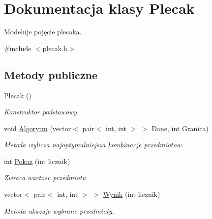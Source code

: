 \hypertarget{class_plecak}{\section{\-Dokumentacja klasy \-Plecak}
\label{class_plecak}
}


\-Modeluje pojęcie plecaka.  




{\ttfamily \#include $<$plecak.\-h$>$}

\subsection*{\-Metody publiczne}
\begin{DoxyCompactItemize}
\item 
\hyperlink{class_plecak_a480d062c962f629f878170f53abbdc44}{\-Plecak} ()
\begin{DoxyCompactList}\small\item\em \-Konstruktor podstawowy. \end{DoxyCompactList}\item 
void \hyperlink{class_plecak_a818e91ff53b7aa01c065a63d907e435f}{\-Algorytm} (vector$<$ pair$<$ int, int $>$ $>$ \-Dane, int \-Granica)
\begin{DoxyCompactList}\small\item\em \-Metoda wylicza najoptymalniejsza kombinacje przedmiotow. \end{DoxyCompactList}\item 
int \hyperlink{class_plecak_a9658246efe996f92cd43b3df68301e13}{\-Pokaz} (int licznik)
\begin{DoxyCompactList}\small\item\em \-Zwraca wartosc przedmiotu. \end{DoxyCompactList}\item 
vector$<$ pair$<$ int, int $>$ $>$ \hyperlink{class_plecak_adc9fd3bec4a3567db44343883a7b02d6}{\-Wynik} (int licznik)
\begin{DoxyCompactList}\small\item\em \-Metoda ukazuje wybrane przedmioty. \end{DoxyCompactList}\end{DoxyCompactItemize}
